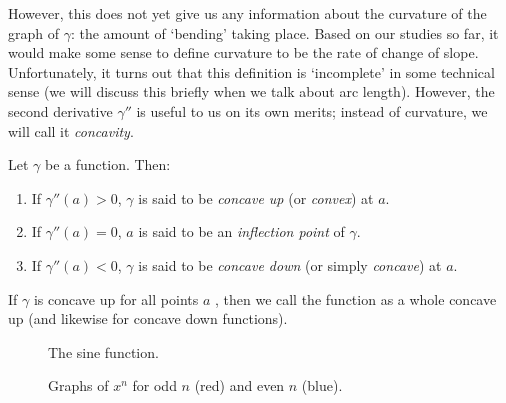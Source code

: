 However, this does not yet give us any information about the curvature of the graph
of $ \gamma $: the amount of `bending' taking place. Based on our studies so far, it
would make some sense to define curvature to be the rate of change of slope. Unfortunately,
it turns out that this definition is `incomplete' in some technical sense (we will
discuss this briefly when we talk about arc length). However, the second derivative $ \gamma'' $
is useful to us on its own merits; instead of curvature, we will call it \emph{concavity}.

\begin{defn}
  Let $ \gamma $ be a function. Then:
  \begin{enumerate}
    \item If $ \gamma''(a) > 0 $, $ \gamma $ is said to be \emph{concave up} (or \emph{convex}) at $ a $.
    \item If $ \gamma''(a) = 0 $, $ a $ is said to be an \emph{inflection point} of $ \gamma $.
    \item If $ \gamma''(a) < 0 $, $ \gamma $ is said to be \emph{concave down} (or simply \emph{concave}) at $ a $.
  \end{enumerate}

  If $ \gamma $ is concave up for all points $ a $ , then we call the function as a whole concave up (and likewise for concave down functions).
\end{defn}

\begin{figure}
  \centering
  \caption{The sine function.\label{fig:sine}}
\end{figure}

\begin{figure}
  \centering
  \caption{Graphs of $ x^n $ for odd $ n $ (red) and even $ n $ (blue).\label{fig:monomials}}
\end{figure}

